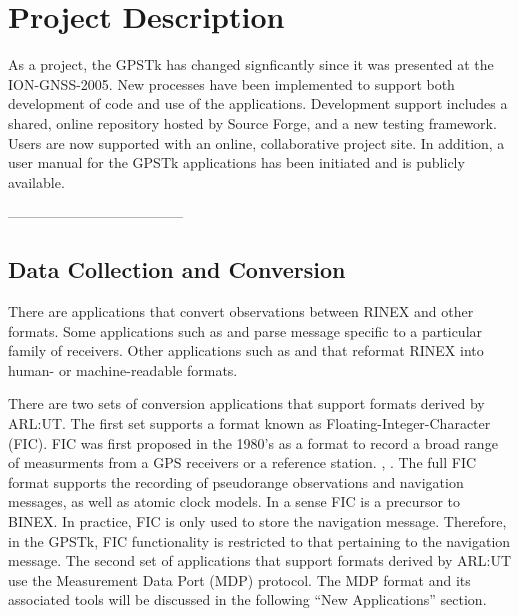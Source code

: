 
\section*{Project Description}

As a project, the GPSTk has changed signficantly since it was
presented at the ION-GNSS-2005. New processes have been implemented to
support both development of code and use of the
applications. Development support includes a shared, online repository
hosted by Source Forge\cite{sourceforge}, and a new testing
framework. Users are now supported with an online, collaborative
project site. In addition, a user manual for the GPSTk applications
has been initiated and is publicly available.


--------------------------------------

\subsection*{Data Collection and Conversion}

There are applications that convert observations between RINEX and
other formats. Some applications such as 
and  parse message specific to a
particular family of receivers. Other applications such as
 and  that
reformat RINEX into human- or machine-readable formats.

There are two sets of conversion applications that support formats
derived by ARL:UT.  The first set supports a format known as
Floating-Integer-Character (FIC). FIC was first proposed in the 1980's
as a format to record a broad range of measurments from a GPS receivers or
a reference station. \cite{rinex1format}, \cite{ficproposal}. The full
FIC format supports the recording of pseudorange observations and
navigation messages, as well as atomic clock models. In a sense FIC is
a precursor to BINEX. In practice, FIC is only used to store the
navigation message. Therefore, in the GPSTk, FIC functionality is
restricted to that pertaining to the navigation message. The
second set of applications that support formats derived by ARL:UT use
the Measurement Data Port (MDP) protocol. The MDP format and its
associated tools will be discussed in the following ``New
Applications'' section.
